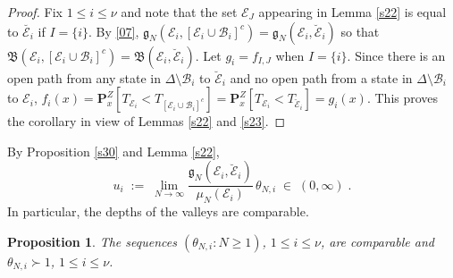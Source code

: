 \documentclass[reqno]{amsart}
\newtheorem{proposition}[theorem]{Proposition}
\begin{document}
\begin{proof}
Fix $1\le i\le \nu$ and note that the set ${{\mathcal E}}_J$ appearing in Lemma
\ref{s22} is equal to $\breve{{{\mathcal E}}_i}$ if $I=\{i\}$.  By \eqref{07},
${{\mathfrak g}}_N({{\mathcal E}}_i, [{{\mathcal E}}_i \cup {{\mathcal B}}_i]^c) = {{\mathfrak g}}_N({{\mathcal E}}_i,
\breve{{{\mathcal E}}}_i)$ so that ${{\mathfrak B}}({{\mathcal E}}_i, [{{\mathcal E}}_i \cup {{\mathcal B}}_i]^c) =
{{\mathfrak B}}({{\mathcal E}}_i, \breve{{{\mathcal E}}}_i)$. Let $g_i = f_{I,J}$ when $I=\{i\}$.
Since there is an open path from any state in $\Delta \setminus {{\mathcal B}}_i$ to $\breve{{{\mathcal E}}}_i$ and no open path from a state in $\Delta
\setminus {{\mathcal B}}_i$ to ${{\mathcal E}}_i$, $f_i(x) = {{\mathbf P}}^Z_x [T_{{{\mathcal E}}_i} <
T_{[{{\mathcal E}}_i \cup {{\mathcal B}}_i]^c}] = {{\mathbf P}}^Z_x [T_{{{\mathcal E}}_i} < T_{\breve{{{\mathcal E}}}_i}] = g_i(x)$. This proves the corollary in view of Lemmas
\ref{s22} and \ref{s23}.
\end{proof}

By Proposition \ref{s30} and Lemma \ref{s22},
\begin{equation}
\label{31}
u_i\;:=\; \lim_{N\to\infty} \frac {{{\mathfrak g}}_N({{\mathcal E}}_i, \breve{{{\mathcal E}}}_i)}
{\mu_N({{\mathcal E}}_i)} \, \theta_{N,i} \; \in\; (0,\infty)\;.
\end{equation}  
In particular, the depths of the valleys are comparable.

\begin{proposition}
\label{s24}
The sequences $(\theta_{N,i}:N\ge 1)$, $1\le i\le\nu$, are comparable
and $\theta_{N,i} \succ 1$, $1\le i\le\nu$.
\end{proposition}
\end{document}
